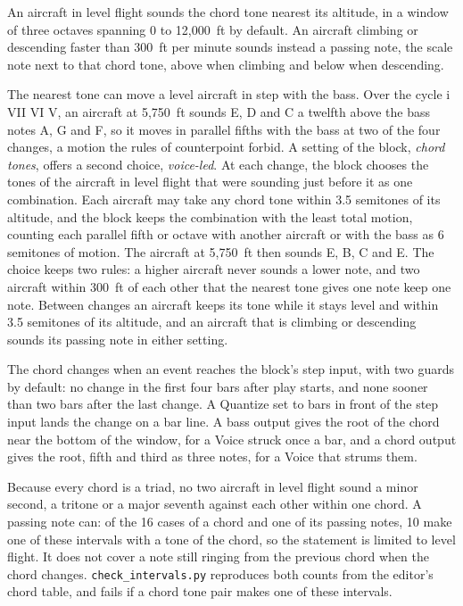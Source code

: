 \documentclass[11pt,letterpaper]{article}
\begin{document}
An aircraft in level flight sounds the chord tone nearest its altitude, in a window of three octaves spanning 0 to 12,000~ft by default. An aircraft climbing or descending faster than 300~ft per minute sounds instead a passing note, the scale note next to that chord tone, above when climbing and below when descending.

The nearest tone can move a level aircraft in step with the bass. Over the cycle i VII VI V, an aircraft at 5,750~ft sounds E, D and C a twelfth above the bass notes A, G and F, so it moves in parallel fifths with the bass at two of the four changes, a motion the rules of counterpoint forbid. A setting of the block, \emph{chord tones}, offers a second choice, \emph{voice-led}. At each change, the block chooses the tones of the aircraft in level flight that were sounding just before it as one combination. Each aircraft may take any chord tone within 3.5 semitones of its altitude, and the block keeps the combination with the least total motion, counting each parallel fifth or octave with another aircraft or with the bass as 6 semitones of motion. The aircraft at 5,750~ft then sounds E, B, C and E. The choice keeps two rules: a higher aircraft never sounds a lower note, and two aircraft within 300~ft of each other that the nearest tone gives one note keep one note. Between changes an aircraft keeps its tone while it stays level and within 3.5 semitones of its altitude, and an aircraft that is climbing or descending sounds its passing note in either setting.

The chord changes when an event reaches the block's step input, with two guards by default: no change in the first four bars after play starts, and none sooner than two bars after the last change. A Quantize set to bars in front of the step input lands the change on a bar line. A bass output gives the root of the chord near the bottom of the window, for a Voice struck once a bar, and a chord output gives the root, fifth and third as three notes, for a Voice that strums them.

Because every chord is a triad, no two aircraft in level flight sound a minor second, a tritone or a major seventh against each other within one chord. A passing note can: of the 16 cases of a chord and one of its passing notes, 10 make one of these intervals with a tone of the chord, so the statement is limited to level flight. It does not cover a note still ringing from the previous chord when the chord changes. \texttt{check\_intervals.py} reproduces both counts from the editor's chord table, and fails if a chord tone pair makes one of these intervals.
\end{document}
